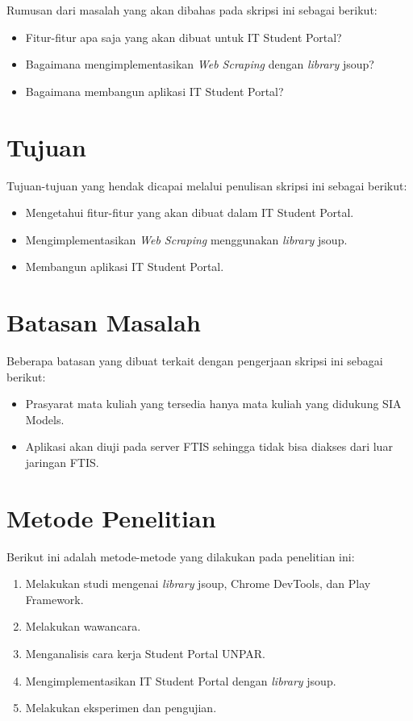 Rumusan dari masalah yang akan dibahas pada skripsi ini sebagai
berikut:
\begin{itemize}
	\item Fitur-fitur apa saja yang akan dibuat untuk IT Student Portal?
	\item Bagaimana mengimplementasikan \textit{Web Scraping} dengan \textit{library} jsoup?
	\item Bagaimana membangun aplikasi IT Student Portal?
\end{itemize}

\section{Tujuan}
\label{sec:tujuan}

Tujuan-tujuan yang hendak dicapai melalui penulisan skripsi ini sebagai berikut:
\begin{itemize}
	\item	Mengetahui fitur-fitur yang akan dibuat dalam IT Student Portal.
	\item	Mengimplementasikan \textit{Web Scraping} menggunakan \textit{library} jsoup.
	\item Membangun aplikasi IT Student Portal.
\end{itemize}

\section{Batasan Masalah}
\label{sec:batasan_masalah}

Beberapa batasan yang dibuat terkait dengan pengerjaan skripsi ini sebagai berikut:
\begin{itemize}
	\item Prasyarat mata kuliah yang tersedia hanya mata kuliah yang didukung SIA Models.
	\item Aplikasi akan diuji pada server FTIS sehingga tidak bisa diakses dari luar jaringan FTIS.
\end{itemize}

\section{Metode Penelitian}
\label{sec:metode_penelitian}

Berikut ini adalah metode-metode yang dilakukan pada penelitian ini:

\begin{enumerate}
	\item Melakukan studi mengenai \textit{library} jsoup, Chrome DevTools, dan Play Framework.
	\item Melakukan wawancara.
	\item Menganalisis cara kerja Student Portal UNPAR.
	\item Mengimplementasikan IT Student Portal dengan \textit{library} jsoup.
	\item Melakukan eksperimen dan pengujian.
\end{enumerate}

